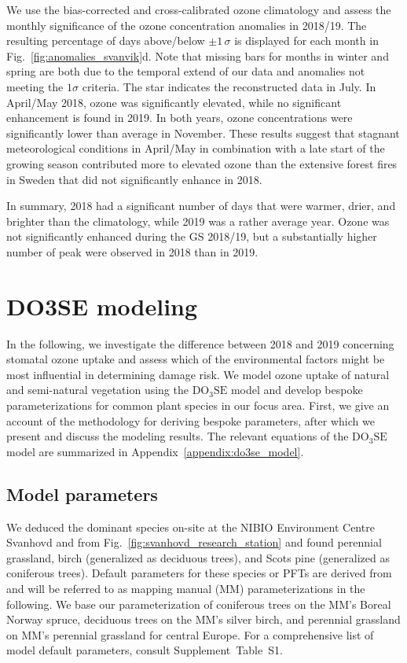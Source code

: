 \documentclass[bg, manuscript]{copernicus}
\begin{document}
We use the bias-corrected and cross-calibrated ozone climatology \citep{ACPD:Falk2021} and assess the monthly significance of the ozone concentration anomalies in 2018/19. The resulting percentage of days above/below $\pm 1\,\sigma$ is displayed for each month in Fig.~\ref{fig:anomalies_svanvik}d. Note that missing bars for months in winter and spring are both due to the temporal extend of our data and anomalies not meeting the $1\sigma$ criteria. The star indicates the reconstructed data in July. In April/May 2018, ozone was significantly elevated, while no significant enhancement is found in 2019. In both years, ozone concentrations were significantly lower than average in November. These results suggest that stagnant meteorological conditions in April/May in combination with a late start of the growing season contributed more to elevated ozone than the extensive forest fires in Sweden that did not significantly enhance \chem{[O_3]} in 2018.

In summary, 2018 had a significant number of days that were warmer, drier, and brighter than the climatology, while 2019 was a rather average year. Ozone was not significantly enhanced during the GS 2018/19, but a substantially higher number of peak \chem{[O_3]} were observed in 2018 than in 2019.

\section{DO3SE modeling}
\label{sec:do3se}
In the following, we investigate the difference between 2018 and 2019 concerning stomatal ozone uptake and assess which of the environmental factors might be most influential in determining  damage risk. We model ozone uptake of natural and semi-natural vegetation using the $\mathrm{DO_3SE}$ model \citep{ACP:Bueker2012} and develop bespoke parameterizations for common plant species in our focus area. First, we give an account of the methodology for deriving bespoke parameters, after which we present and discuss the modeling results. The relevant equations of the $\mathrm{DO_3SE}$ model are summarized in Appendix~\ref{appendix:do3se_model}.

\subsection{Model parameters}
\label{subsec:do3se_parameters}

We deduced the dominant species on-site at the NIBIO Environment Centre Svanhovd and from Fig.~\ref{fig:svanhovd_research_station} and found perennial grassland, birch (generalized as deciduous trees), and Scots pine (generalized as coniferous trees). Default parameters for these species or PFTs are derived from \citet{EP:Simpson2007,GCB:Mills2011,ICP:MappingManual2017} and will be referred to as mapping manual (MM) parameterizations in the following. We base our parameterization of coniferous trees on the MM's Boreal Norway spruce, deciduous trees on the MM's silver birch, and perennial grassland on MM's perennial grassland for central Europe. For a comprehensive list of model default parameters, consult Supplement~Table~S1.
\end{document}

